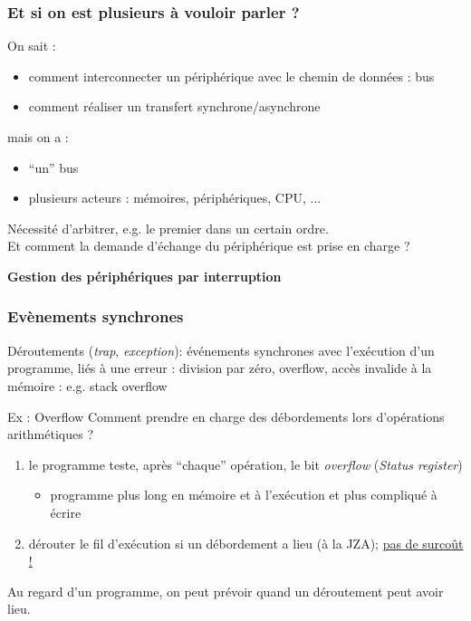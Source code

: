 \documentclass{beamer}
\begin{document}
\begin{frame}
\frametitle{Et si on est plusieurs à vouloir parler ?}

On sait :
\begin{itemize}
\item comment interconnecter un périphérique avec le chemin de données : bus
\item comment réaliser un transfert synchrone/asynchrone
\end{itemize}
mais on a :
\begin{itemize}
\item ``un'' bus
\item plusieurs acteurs : mémoires, périphériques, CPU, ...
\end{itemize}

Nécessité d'arbitrer, e.g. le premier dans un certain ordre.\\

Et comment la demande d'échange du périphérique est prise en charge ?

\end{frame}



\begin{frame}
\begin{center}
\textbf{Gestion des périphériques par interruption}
\end{center}
\end{frame}

\begin{frame}
\frametitle{Evènements synchrones}

Déroutements (\emph{trap}, \emph{exception}): événements synchrones avec l'exécution d'un programme, liés à une erreur : division par zéro, overflow, accès invalide à la mémoire : e.g. stack overflow

\begin{small}
\begin{block}{Ex : Overflow}
Comment prendre en charge des débordements lors d'opérations arithmétiques ?
\begin{enumerate}
\item le programme teste, après ``chaque'' opération, le bit \emph{overflow} (\emph{Status register})
\begin{itemize}
\item programme plus long en mémoire et à l'exécution et plus compliqué à écrire
\end{itemize}
\item dérouter le fil d'exécution si un débordement a lieu (à la JZA); \underline{pas de surcoût !}
\end{enumerate}
\end{block}
\end{small}

Au regard d'un programme, on peut prévoir quand un déroutement peut avoir lieu.
\end{frame}
\end{document}
